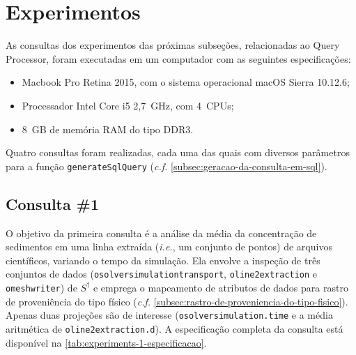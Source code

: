 
\section{Experimentos}

As consultas dos experimentos das próximas subseções, relacionadas ao Query Processor, foram executadas em um computador com as seguintes especificações:

\begin{itemize}
	\item Macbook Pro Retina 2015, com o sistema operacional macOS Sierra 10.12.6;
    \item Processador Intel Core i5 2,7~GHz, com 4~CPUs;
    \item 8~GB de memória RAM do tipo DDR3.
\end{itemize}

Quatro consultas foram realizadas, cada uma das quais com diversos parâmetros para a função \texttt{generateSqlQuery} (\textit{c.f.} \autoref{subsec:geracao-da-consulta-em-sql}).

\subsection{Consulta \#1}

%

%

O objetivo da primeira consulta é a análise da média da concentração de sedimentos em uma linha extraída (\textit{i.e.}, um conjunto de pontos) de arquivos científicos, variando o tempo da simulação. Ela envolve a inspeção de três conjuntos de dados (\texttt{osolversimulationtransport}, \texttt{oline2extraction} e \texttt{omeshwriter}) de \(S^{\dagger}\) e emprega o mapeamento de atributos de dados para rastro de proveniência do tipo físico (\textit{c.f.} \autoref{subsec:rastro-de-proveniencia-do-tipo-fisico}). Apenas duas projeções são de interesse (\texttt{osolversimulation.time} e a média aritmética de \texttt{oline2extraction.d}). A especificação completa da consulta está disponível na \autoref{tab:experiments-1-especificacao}.

